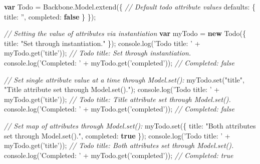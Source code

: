 \documentclass[9pt]{book}
\newenvironment{Shaded}{}{}
\newcommand{\KeywordTok}[1]{\textcolor[rgb]{0.00,0.44,0.13}{\textbf{{#1}}}}
\newcommand{\DataTypeTok}[1]{\textcolor[rgb]{0.56,0.13,0.00}{{#1}}}
\newcommand{\StringTok}[1]{\textcolor[rgb]{0.25,0.44,0.63}{{#1}}}
\newcommand{\CommentTok}[1]{\textcolor[rgb]{0.38,0.63,0.69}{\textit{{#1}}}}
\newcommand{\OtherTok}[1]{\textcolor[rgb]{0.00,0.44,0.13}{{#1}}}
\newcommand{\FunctionTok}[1]{\textcolor[rgb]{0.02,0.16,0.49}{{#1}}}
\newcommand{\NormalTok}[1]{{#1}}
\begin{document}
\begin{Shaded}
\begin{Highlighting}[]
\KeywordTok{var} \NormalTok{Todo = }\OtherTok{Backbone}\NormalTok{.}\OtherTok{Model}\NormalTok{.}\FunctionTok{extend}\NormalTok{(\{}
  \CommentTok{// Default todo attribute values}
  \DataTypeTok{defaults}\NormalTok{: \{}
    \DataTypeTok{title}\NormalTok{: }\StringTok{''}\NormalTok{,}
    \DataTypeTok{completed}\NormalTok{: }\KeywordTok{false}
  \NormalTok{\}}
\NormalTok{\});}

\CommentTok{// Setting the value of attributes via instantiation}
\KeywordTok{var} \NormalTok{myTodo = }\KeywordTok{new} \FunctionTok{Todo}\NormalTok{(\{}
  \DataTypeTok{title}\NormalTok{: }\StringTok{"Set through instantiation."}
\NormalTok{\});}
\OtherTok{console}\NormalTok{.}\FunctionTok{log}\NormalTok{(}\StringTok{'Todo title: '} \NormalTok{+ }\OtherTok{myTodo}\NormalTok{.}\FunctionTok{get}\NormalTok{(}\StringTok{'title'}\NormalTok{)); }\CommentTok{// Todo title: Set through instantiation.}
\OtherTok{console}\NormalTok{.}\FunctionTok{log}\NormalTok{(}\StringTok{'Completed: '} \NormalTok{+ }\OtherTok{myTodo}\NormalTok{.}\FunctionTok{get}\NormalTok{(}\StringTok{'completed'}\NormalTok{)); }\CommentTok{// Completed: false}

\CommentTok{// Set single attribute value at a time through Model.set():}
\OtherTok{myTodo}\NormalTok{.}\FunctionTok{set}\NormalTok{(}\StringTok{"title"}\NormalTok{, }\StringTok{"Title attribute set through Model.set()."}\NormalTok{);}
\OtherTok{console}\NormalTok{.}\FunctionTok{log}\NormalTok{(}\StringTok{'Todo title: '} \NormalTok{+ }\OtherTok{myTodo}\NormalTok{.}\FunctionTok{get}\NormalTok{(}\StringTok{'title'}\NormalTok{)); }\CommentTok{// Todo title: Title attribute set through Model.set().}
\OtherTok{console}\NormalTok{.}\FunctionTok{log}\NormalTok{(}\StringTok{'Completed: '} \NormalTok{+ }\OtherTok{myTodo}\NormalTok{.}\FunctionTok{get}\NormalTok{(}\StringTok{'completed'}\NormalTok{)); }\CommentTok{// Completed: false}

\CommentTok{// Set map of attributes through Model.set():}
\OtherTok{myTodo}\NormalTok{.}\FunctionTok{set}\NormalTok{(\{}
  \DataTypeTok{title}\NormalTok{: }\StringTok{"Both attributes set through Model.set()."}\NormalTok{,}
  \DataTypeTok{completed}\NormalTok{: }\KeywordTok{true}
\NormalTok{\});}
\OtherTok{console}\NormalTok{.}\FunctionTok{log}\NormalTok{(}\StringTok{'Todo title: '} \NormalTok{+ }\OtherTok{myTodo}\NormalTok{.}\FunctionTok{get}\NormalTok{(}\StringTok{'title'}\NormalTok{)); }\CommentTok{// Todo title: Both attributes set through Model.set().}
\OtherTok{console}\NormalTok{.}\FunctionTok{log}\NormalTok{(}\StringTok{'Completed: '} \NormalTok{+ }\OtherTok{myTodo}\NormalTok{.}\FunctionTok{get}\NormalTok{(}\StringTok{'completed'}\NormalTok{)); }\CommentTok{// Completed: true}
\end{Highlighting}
\end{Shaded}
\end{document}
